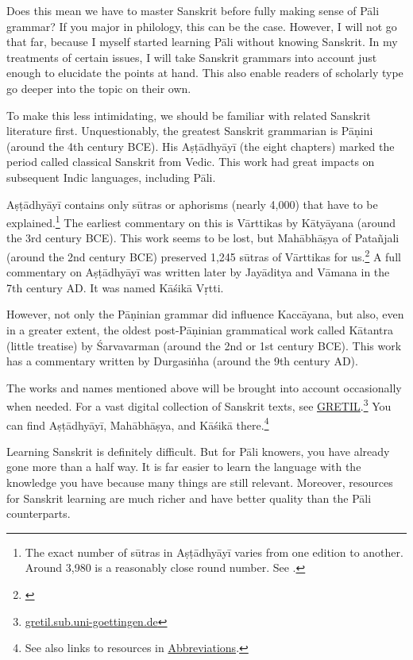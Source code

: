 Does this mean we have to master Sanskrit before fully making sense of Pāli grammar? If you major in philology, this can be the case. However, I will not go that far, because I myself started learning Pāli without knowing Sanskrit. In my treatments of certain issues, I will take Sanskrit grammars into account just enough to elucidate the points at hand. This also enable readers of scholarly type go deeper into the topic on their own.

To make this less intimidating, we should be familiar with related Sanskrit literature first. Unquestionably, the greatest Sanskrit grammarian is Pāṇini (around the 4th century BCE). His Aṣṭādhyāyī (the eight chapters) marked the period called classical Sanskrit from Vedic. This work had great impacts on subsequent Indic languages, including Pāli.

Aṣṭādhyāyī contains only sūtras or aphorisms (nearly 4,000) that have to be explained.\footnote{The exact number of sūtras in Aṣṭādhyāyī varies from one edition to another. Around 3,980 is a reasonably close round number. See \citealp[pp.~36--37]{deokar:terms}.} The earliest commentary on this is Vārttikas by Kātyāyana (around the 3rd century BCE). This work seems to be lost, but Mahābhāṣya of Patañjali (around the 2nd century BCE) preserved 1,245 sūtras of Vārttikas for us.\footnote{\citealp[p.~426]{keith:history}} A full commentary on Aṣṭādhyāyī was written later by Jayāditya and Vāmana in the 7th century AD. It was named Kāśikā Vṛtti.

However, not only the Pāṇinian grammar did influence Kaccāyana, but also, even in a greater extent, the oldest post-Pāṇinian grammatical work called Kātantra (little treatise) by Śarvavarman (around the 2nd or 1st century BCE). This work has a commentary written by Durgasiṅha (around the 9th century AD).

The works and names mentioned above will be brought into account occasionally when needed. For a vast digital collection of Sanskrit texts, see \href{https://gretil.sub.uni-goettingen.de/}{GRETIL}.\footnote{\url{gretil.sub.uni-goettingen.de}} You can find Aṣṭādhyāyī, Mahābhāṣya, and Kāśikā there.\footnote{See also links to resources in \hyperref[chap:abbrev]{Abbreviations}.}

Learning Sanskrit is definitely difficult. But for Pāli knowers, you have already gone more than a half way. It is far easier to learn the language with the knowledge you have because many things are still relevant. Moreover, resources for Sanskrit learning are much richer and have better quality than the Pāli counterparts.
